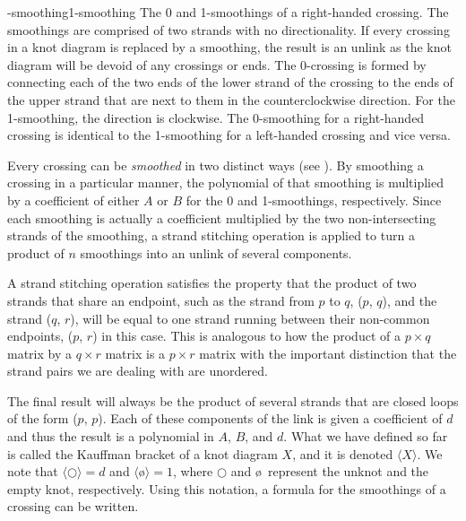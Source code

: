 \begin{paper}
{-smoothing\hfill 1-smoothing}
{The 0 and 1-smoothings of a right-handed crossing.
The smoothings are comprised of two strands with no directionality.
If every crossing in a knot diagram is replaced by a smoothing, the result is an
unlink as the knot diagram will be devoid of any crossings or ends.
The 0-crossing is formed by connecting each of the two ends of the lower strand
of the crossing to the ends of the upper strand that are next to them in the
counterclockwise direction.
For the 1-smoothing, the direction is clockwise.
The 0-smoothing for a right-handed crossing is identical to the 1-smoothing for
a left-handed crossing and vice versa.}

Every crossing can be \textit{smoothed} in two distinct ways (see
\figSmoothings).
By smoothing a crossing in a particular manner, the polynomial of that smoothing
is multiplied by a coefficient of either $A$ or $B$ for the 0 and 1-smoothings,
respectively.
Since each smoothing is actually a coefficient multiplied by the two
non-intersecting strands of the smoothing, a strand stitching operation is
applied to turn a product of $n$ smoothings into an unlink of several
components.

A strand stitching operation satisfies the property that the product of two
strands that share an endpoint, such as the strand from $p$ to $q$, ($p$, $q$),
and the strand ($q$, $r$), will be equal to one strand running between their
non-common endpoints, ($p$, $r$) in this case.
This is analogous to how the product of a $p\times q$ matrix by a $q\times r$
matrix is a $p\times r$ matrix with the important distinction that the strand
pairs we are dealing with are unordered.

The final result will always be the product of several strands that are closed
loops of the form ($p$, $p$).
Each of these components of the link is given a coefficient of $d$ and thus the
result is a polynomial in $A$, $B$, and $d$.
What we have defined so far is called the Kauffman bracket of a knot diagram
$X$, and it is denoted $\langle X\rangle$.
We note that $\langle\bigcirc\rangle=d$ and $\langle$\o$\rangle=1$, where
$\bigcirc$ and \o~represent the unknot and the empty knot, respectively.
Using this notation, a formula for the smoothings of a crossing can be written.


\end{paper}
